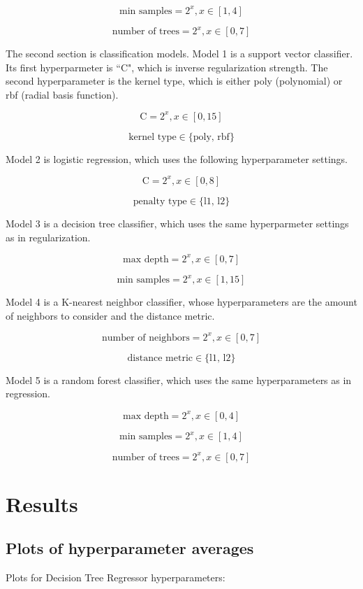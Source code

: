 \documentclass[12pt, letterpaper]{article}
\begin{document}
$$
\text{min samples} = 2^x, x \in [1,4]
$$

$$
\text{number of trees} = 2^x, x \in [0,7]
$$

The second section is classification models. Model 1 is a support vector classifier. Its first hyperparmeter is ``C", which is inverse regularization strength. The second hyperparameter is the kernel type, which is either poly (polynomial) or rbf (radial basis function).

$$
\text{C} = 2^x, x \in [0,15]
$$

$$
\text{kernel type} \in \{\text{poly, rbf}\}
$$

Model 2 is logistic regression, which uses the following hyperparameter settings.

$$
\text{C} = 2^x, x \in [0,8]
$$

$$
\text{penalty type} \in \{\text{l1, l2}\}
$$

Model 3 is a decision tree classifier, which uses the same hyperparmeter settings as in regularization.

$$
\text{max depth} = 2^x, x \in [0,7]
$$

$$
\text{min samples} = 2^x, x \in [1,15]
$$

Model 4 is a K-nearest neighbor classifier, whose hyperparameters are the amount of neighbors to consider and the distance metric.

$$
\text{number of neighbors} = 2^x, x \in [0,7]
$$

$$
\text{distance metric} \in \{\text{l1, l2}\}
$$

Model 5 is a random forest classifier, which uses the same hyperparameters as in regression.

$$
\text{max depth} = 2^x, x \in [0,4]
$$

$$
\text{min samples} = 2^x, x \in [1,4]
$$

$$
\text{number of trees} = 2^x, x \in [0,7]
$$

\section{Results} %

\subsection{Plots of hyperparameter averages}

\newcommand{\myscale}{0.4}

Plots for Decision Tree Regressor hyperparameters:
\end{document}
